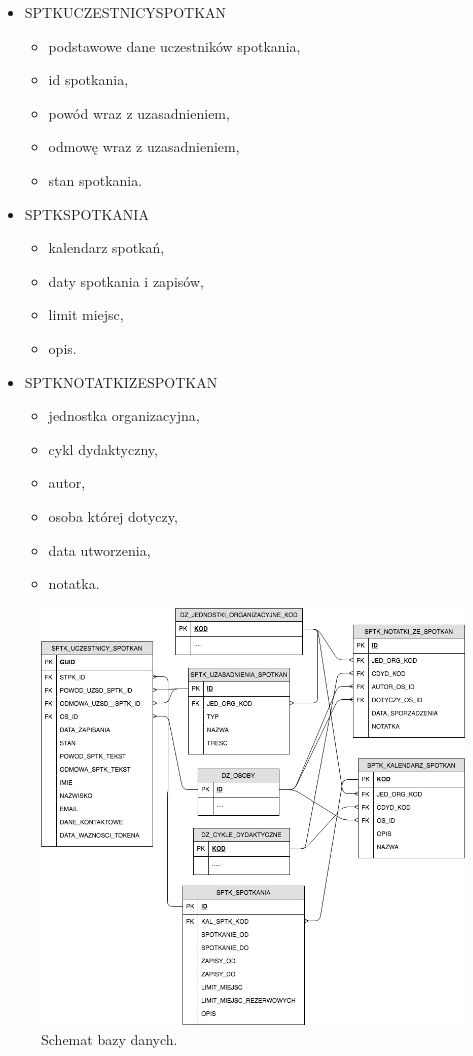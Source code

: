 \documentclass[licencjacka]{pracamgr}
\begin{document}
\begin{itemize}
\item SPTK\textunderscore UCZESTNICY\textunderscore SPOTKAN
	\begin{itemize}
	\item podstawowe dane uczestników spotkania,
	\item id spotkania,
	\item powód wraz z uzasadnieniem,
	\item odmowę wraz z uzasadnieniem,
	\item stan spotkania.
	\end{itemize}
\item SPTK\textunderscore SPOTKANIA
	\begin{itemize}
	\item kalendarz spotkań,
	\item daty spotkania i zapisów,
	\item limit miejsc,
	\item opis.
	\end{itemize}
\item SPTK\textunderscore NOTATKI\textunderscore ZE\textunderscore SPOTKAN
	\begin{itemize}
	\item jednostka organizacyjna,
	\item cykl dydaktyczny,
	\item autor,
	\item osoba której dotyczy,
	\item data utworzenia,
	\item notatka.
	\end{itemize}
\end{itemize}

\begin{figure}[!]
  \includegraphics[width=\linewidth]{schemat.jpg}
  \caption{Schemat bazy danych.}
  \label{fig:schemat}
\end{figure}
\end{document}
